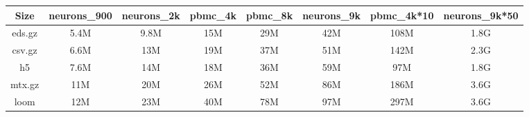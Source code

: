 \begin{center}
 \begin{tabular}{||c || c | c | c | c | c | c | c ||}
 \hline
 Size & neurons\_900 & neurons\_2k & pbmc\_4k & pbmc\_8k & neurons\_9k & pbmc\_4k*10 & neurons\_9k*50 \\ [0.5ex]
 \hline\hline
 eds.gz & 5.4M & 9.8M & 15M & 29M & 42M & 108M & 1.8G \\
 \hline
 csv.gz & 6.6M & 13M & 19M & 37M & 51M & 142M & 2.3G \\
 \hline
 h5 & 7.6M & 14M & 18M & 36M & 59M & 97M & 1.8G \\
 \hline
 mtx.gz & 11M & 20M & 26M & 52M & 86M & 186M & 3.6G \\
 \hline
 loom & 12M & 23M & 40M & 78M & 97M & 297M & 3.6G \\ [1ex]
 \hline
\end{tabular}
\end{center}
